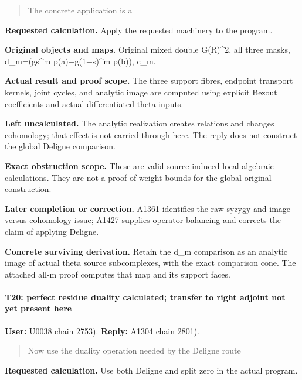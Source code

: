 \begin{quote}
The concrete application is a
\end{quote}

\textbf{Requested calculation.} Apply the requested machinery to the
program.

\textbf{Original objects and maps.} Original mixed double G(R)\^{}2, all
three masks, d\_m=(gs\^{}m
p(a)\allowbreak{}\ensuremath{−}\allowbreak{}g(1\allowbreak{}\ensuremath{−}\allowbreak{}s)\textasciicircum{}m
p(b)), c\_m.

\textbf{Actual result and proof scope.} The three support fibres,
endpoint transport kernels, joint cycles, and analytic image are
computed using explicit Bezout coefficients and actual differentiated
theta inputs.

\textbf{Left uncalculated.} The analytic realization creates relations
and changes cohomology; that effect is not carried through here. The
reply does not construct the global Deligne comparison.

\textbf{Exact obstruction scope.} These are valid source-induced local
algebraic calculations. They are not a proof of weight bounds for the
global original construction.

\textbf{Later completion or correction.} A1361 identifies the raw syzygy
and image-versus-cohomology issue; A1427 supplies operator balancing and
corrects the claim of applying Deligne.

\textbf{Concrete surviving derivation.} Retain the d\_m comparison as an
analytic image of actual theta source subcomplexes, with the exact
comparison cone. The attached all-m proof computes that map and its
support faces.

\paragraph{T20: perfect residue duality calculated; transfer to right
adjoint not yet present
here}\label{t20-perfect-residue-duality-calculated-transfer-to-right-adjoint-not-yet-present-here}

\textbf{User:} U0038
\protect{} chain 2753).
\textbf{Reply:} A1304
\protect{} chain 2801).

\begin{quote}
Now use the duality operation needed by the Deligne route
\end{quote}

\textbf{Requested calculation.} Use both Deligne and split zero in the
actual program.


